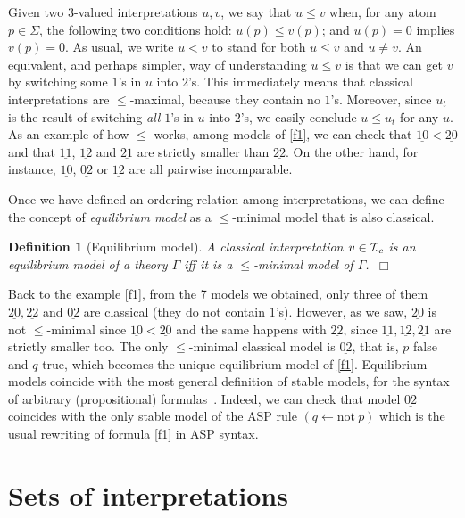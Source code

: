\documentclass{tlp}
\def\cIc{{\cal I}_{\, c}}
\def\Not{\text{not} \ }
\def\qed{~\hfill$\Box$}
\newtheorem{definition}{Definition}
\newcommand{\str}[1]{\underline{#1}}
\begin{document}
Given two 3-valued interpretations $u,v$, we say that $u \leq v$ when, for any atom $p \in \Sigma$, the following two conditions hold: $u(p) \leq v(p)$; and $u(p)=0$ implies $v(p)=0$. As usual, we write $u < v$ to stand for both $u\leq v$ and $u\neq v$. An equivalent, and perhaps simpler, way of understanding $u \leq v$ is that we can get $v$ by switching some $1$'s in $u$ into $2$'s. This immediately means that classical interpretations are $\leq$-maximal, because they contain no $1$'s. Moreover, since $u_t$ is the result of switching \emph{all} $1$'s in $u$ into $2$'s, we easily conclude $u \leq u_t$ for any $u$. As an example of how $\leq$ works, among models of \eqref{f1}, we can check that $\str{10} < \str{20}$ and that $\str{11}$, $\str{12}$ and $\str{21}$ are strictly smaller than $\str{22}$. On the other hand, for instance, $\str{10}$, $\str{02}$ or $\str{12}$ are all pairwise incomparable.

Once we have defined an ordering relation among interpretations, we can define the concept of \emph{equilibrium model} as a $\leq$-minimal model that is also classical.

\begin{definition}[Equilibrium model]
A classical interpretation $v \in \cIc$ is an \emph{equilibrium model} of a theory $\Gamma$ iff it is a $\leq$-minimal model of $\Gamma$.\qed
\end{definition}

Back to the example \eqref{f1}, from the 7 models we obtained, only three of them $\str{20}, \str{22}$ and $\str{02}$ are classical (they do not contain $1$'s). However, as we saw, $\str{20}$ is not $\leq$-minimal since $\str{10}<\str{20}$ and the same happens with $\str{22}$, since $\str{11}, \str{12}, \str{21}$ are strictly smaller too. The only $\leq$-minimal classical model is $\str{02}$, that is, $p$ false and $q$ true, which becomes the unique equilibrium model of \eqref{f1}. Equilibrium models coincide with the most general definition of stable models, for the syntax of arbitrary (propositional) formulas~\cite{Fer05}. Indeed, we can check that model $\str{02}$ coincides with the only stable model of the ASP rule $(q \leftarrow \Not p)$ which is the usual rewriting of formula \eqref{f1} in ASP syntax. 

\section{Sets of interpretations}\label{sec:sets}
\end{document}

